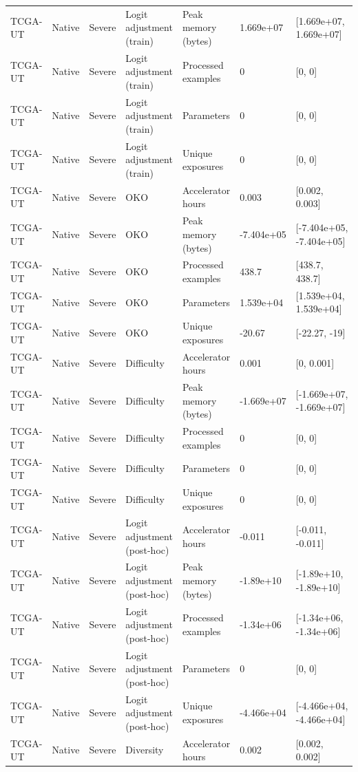 \begin{longtable}{lllllll}
TCGA-UT & Native & Severe & Logit adjustment (train) & Peak memory (bytes) & 1.669e+07 & [1.669e+07, 1.669e+07] \\
TCGA-UT & Native & Severe & Logit adjustment (train) & Processed examples & 0 & [0, 0] \\
TCGA-UT & Native & Severe & Logit adjustment (train) & Parameters & 0 & [0, 0] \\
TCGA-UT & Native & Severe & Logit adjustment (train) & Unique exposures & 0 & [0, 0] \\
TCGA-UT & Native & Severe & OKO & Accelerator hours & 0.003 & [0.002, 0.003] \\
TCGA-UT & Native & Severe & OKO & Peak memory (bytes) & -7.404e+05 & [-7.404e+05, -7.404e+05] \\
TCGA-UT & Native & Severe & OKO & Processed examples & 438.7 & [438.7, 438.7] \\
TCGA-UT & Native & Severe & OKO & Parameters & 1.539e+04 & [1.539e+04, 1.539e+04] \\
TCGA-UT & Native & Severe & OKO & Unique exposures & -20.67 & [-22.27, -19] \\
TCGA-UT & Native & Severe & Difficulty & Accelerator hours & 0.001 & [0, 0.001] \\
TCGA-UT & Native & Severe & Difficulty & Peak memory (bytes) & -1.669e+07 & [-1.669e+07, -1.669e+07] \\
TCGA-UT & Native & Severe & Difficulty & Processed examples & 0 & [0, 0] \\
TCGA-UT & Native & Severe & Difficulty & Parameters & 0 & [0, 0] \\
TCGA-UT & Native & Severe & Difficulty & Unique exposures & 0 & [0, 0] \\
TCGA-UT & Native & Severe & Logit adjustment (post-hoc) & Accelerator hours & -0.011 & [-0.011, -0.011] \\
TCGA-UT & Native & Severe & Logit adjustment (post-hoc) & Peak memory (bytes) & -1.89e+10 & [-1.89e+10, -1.89e+10] \\
TCGA-UT & Native & Severe & Logit adjustment (post-hoc) & Processed examples & -1.34e+06 & [-1.34e+06, -1.34e+06] \\
TCGA-UT & Native & Severe & Logit adjustment (post-hoc) & Parameters & 0 & [0, 0] \\
TCGA-UT & Native & Severe & Logit adjustment (post-hoc) & Unique exposures & -4.466e+04 & [-4.466e+04, -4.466e+04] \\
TCGA-UT & Native & Severe & Diversity & Accelerator hours & 0.002 & [0.002, 0.002] \\

\end{longtable}
